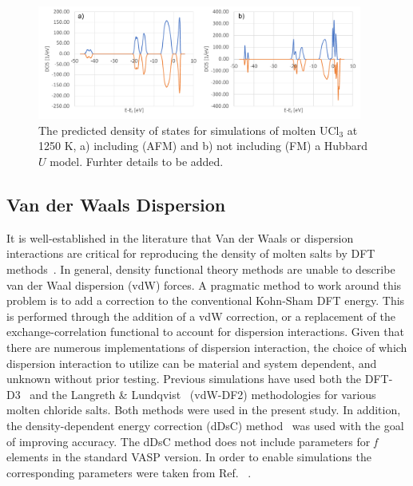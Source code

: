 \documentclass[preprint,3p,10pt,onecolumn,number,sort&compress]{elsarticle}
\begin{document}
\begin{figure}[h]
\centering
\includegraphics[width=0.95\textwidth]{FIG01.pdf}
\caption{The predicted density of states for simulations of molten UCl$_3$ at 1250 K, a) including (AFM) and b) not including (FM) a Hubbard $U$ model. {\color{red} Furhter details to be added.}} 
\label{fig:DOS}
\end{figure}


\subsection{Van der Waals Dispersion}

It is well-established in the literature that Van der Waals or dispersion interactions are critical for reproducing the density of molten salts by DFT methods~\cite{Li,Nam2014,Nam2015}. In general, density functional theory methods are unable to describe van der Waal dispersion (vdW) forces. A pragmatic method to work around this problem is to add a correction to the conventional Kohn-Sham DFT energy. This is performed through the addition of a vdW correction, or a replacement of the exchange-correlation functional to account for dispersion interactions. Given that there are numerous implementations of dispersion interaction, the choice of which dispersion interaction to utilize can be material and system dependent, and unknown without prior testing. Previous simulations have used both the DFT-D3~\cite{Li,Grimme} and the Langreth \& Lundqvist~\cite{Nam2015,Dion,Klimes} (vdW-DF2) methodologies for various molten chloride salts. Both methods were used in the present study. In addition, the density-dependent energy correction (dDsC) method~\cite{Steinmann2011,Steinmann2} was used with the goal of improving accuracy. The dDsC method does not include parameters for \textit{f} elements in the standard VASP version. In order to enable simulations the corresponding parameters were taken from Ref. ~\cite{Kim}. 
\end{document}
